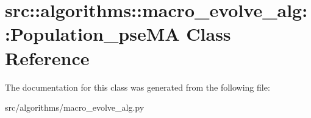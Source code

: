\hypertarget{classsrc_1_1algorithms_1_1macro__evolve__alg_1_1Population__pseMA}{
\section{src::algorithms::macro\_\-evolve\_\-alg::Population\_\-pseMA Class Reference}
\label{classsrc_1_1algorithms_1_1macro__evolve__alg_1_1Population__pseMA}
}


The documentation for this class was generated from the following file:\begin{DoxyCompactItemize}
\item 
src/algorithms/macro\_\-evolve\_\-alg.py\end{DoxyCompactItemize}
